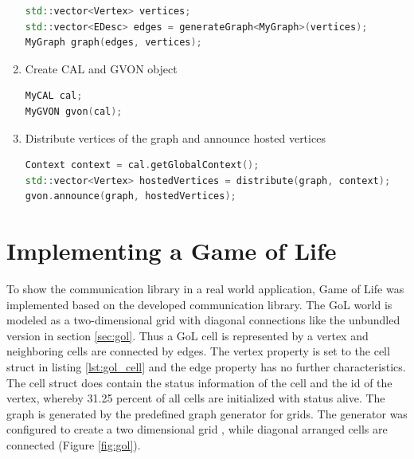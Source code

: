\begin{enumerate}
  \begin{lstlisting}[language=C++, label=lst:, style=types]
std::vector<Vertex> vertices;
std::vector<EDesc> edges = generateGraph<MyGraph>(vertices);
MyGraph graph(edges, vertices);
  \end{lstlisting}

\item Create CAL and GVON object

  \begin{lstlisting}[language=C++, label=lst:, style=types]
MyCAL cal;
MyGVON gvon(cal);
  \end{lstlisting}

\item Distribute vertices of the graph and announce hosted vertices

  \begin{lstlisting}[language=C++, label=lst:, style=types]
Context context = cal.getGlobalContext();
std::vector<Vertex> hostedVertices = distribute(graph, context);
gvon.announce(graph, hostedVertices);
  \end{lstlisting}

\end{enumerate}

\section{Implementing a Game of Life}
\label{sec:gol_imp}
To show the communication library in a real world application, Game of
Life was implemented based on the developed communication library.
The GoL world is modeled as a two-dimensional grid with diagonal
connections like the unbundled version in section \ref{sec:gol}. Thus
a GoL cell is represented by a vertex and neighboring cells are
connected by edges. The vertex property is set to the cell struct in
listing \ref{lst:gol_cell} and the edge property has no further
characteristics. The cell struct does contain the status information
of the cell and the id of the vertex, whereby 31.25 percent of all
cells are initialized with status alive.  The graph is generated by
the predefined graph generator for grids. The generator was configured
to create a two dimensional grid , while diagonal arranged cells are
connected (Figure \ref{fig:gol}).

